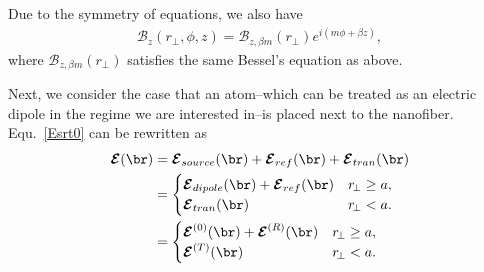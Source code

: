 \documentclass[]{report}
\begin{document}
Due to the symmetry of equations, we also have
\begin{align}
\mathcal{B}_z(r\!_\perp,\phi,z) = \mathcal{B}_{z,\beta m}(r\!_\perp)e^{i(m\phi+\beta z)},
\end{align}
where $  \mathcal{B}_{z,\beta m}(r\!_\perp) $ satisfies the same Bessel's equation as above. 

Next, we consider the case that an atom--which can be treated as an electric dipole in the regime we are interested in--is placed next to the 
nanofiber. Equ.~\eqref{Esrt0} can be rewritten as 
\begin{align}
\boldsymbol{\mathcal{E}}(\br) &= \boldsymbol{\mathcal{E}}_{source}(\br) + 
\boldsymbol{\mathcal{E}}_{ref}(\br)+\boldsymbol{\mathcal{E}}_{tran}(\br)\\
&=
	\begin{cases}
	  \boldsymbol{\mathcal{E}}_{dipole} (\br)+ \boldsymbol{\mathcal{E}}_{ref}(\br) & r\!_\perp \geq a,\\
	  \boldsymbol{\mathcal{E}}_{tran}(\br) & r\!_\perp<a.
	\end{cases} \\
&=
	\begin{cases}
		  \boldsymbol{\mathcal{E}}^{(0)} (\br)+ \boldsymbol{\mathcal{E}}^{(R)}(\br) & r\!_\perp \geq a,\\
		  \boldsymbol{\mathcal{E}}^{(T)}(\br) & r\!_\perp<a.
		\end{cases} \label{Etotalfiber}
\end{align}
\end{document}
